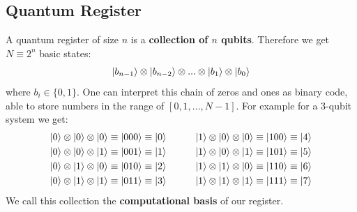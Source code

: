 \documentclass[bibliography=totocnumbered, 10pt]{article}
\theoremstyle{NoticeStyle}
\begin{document}
\subsection{Quantum Register}\label{sec:Quantum register}
A quantum register of size $n$ is a \textbf{collection of $n$ qubits}. Therefore we get $N \equiv 2^n$ basic states:
%
\begin{align}
	\ket{b_{n-1}} \otimes \ket{b_{n-2}} \otimes ... \otimes \ket{b_1} \otimes \ket{b_0}
\end{align}
%
where $b_i \in \{0, 1\}$. One can interpret this chain of zeros and ones as binary code, able to store numbers in the range of $[0, 1, ..., N-1]$. For example for a 3-qubit system we get:
%
\begin{align*}
	\ket{0} \otimes \ket{0} \otimes \ket{0} \equiv \ket{000} \equiv \ket{0} \quad\quad\quad
	\ket{1} \otimes \ket{0} \otimes \ket{0} \equiv \ket{100} \equiv \ket{4}\\
	\ket{0} \otimes \ket{0} \otimes \ket{1} \equiv \ket{001} \equiv \ket{1} \quad\quad\quad
	\ket{1} \otimes \ket{0} \otimes \ket{1} \equiv \ket{101} \equiv \ket{5}\\
	\ket{0} \otimes \ket{1} \otimes \ket{0} \equiv \ket{010} \equiv \ket{2} \quad\quad\quad
	\ket{1} \otimes \ket{1} \otimes \ket{0} \equiv \ket{110} \equiv \ket{6}\\
	\ket{0} \otimes \ket{1} \otimes \ket{1} \equiv \ket{011} \equiv \ket{3} \quad\quad\quad
	\ket{1} \otimes \ket{1} \otimes \ket{1} \equiv \ket{111} \equiv \ket{7}
\end{align*}
%
We call this collection the \textbf{computational basis} of our register.
\end{document}
